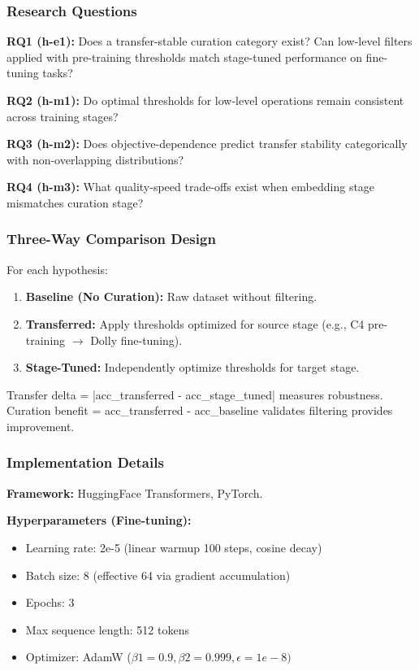 
\subsubsection{Research Questions}

\textbf{RQ1 (h-e1):} Does a transfer-stable curation category exist? Can low-level filters applied with pre-training thresholds match stage-tuned performance on fine-tuning tasks?

\textbf{RQ2 (h-m1):} Do optimal thresholds for low-level operations remain consistent across training stages?

\textbf{RQ3 (h-m2):} Does objective-dependence predict transfer stability categorically with non-overlapping distributions?

\textbf{RQ4 (h-m3):} What quality-speed trade-offs exist when embedding stage mismatches curation stage?

\subsubsection{Three-Way Comparison Design}

For each hypothesis:

\begin{enumerate}
\item \textbf{Baseline (No Curation):} Raw dataset without filtering.
\item \textbf{Transferred:} Apply thresholds optimized for source stage (e.g., C4 pre-training $\rightarrow$ Dolly fine-tuning).
\item \textbf{Stage-Tuned:} Independently optimize thresholds for target stage.
\end{enumerate}

Transfer delta = |acc\_transferred - acc\_stage\_tuned| measures robustness. Curation benefit = acc\_transferred - acc\_baseline validates filtering provides improvement.

\subsubsection{Implementation Details}

\textbf{Framework:} HuggingFace Transformers, PyTorch.

\textbf{Hyperparameters (Fine-tuning):}
\begin{itemize}
\item Learning rate: 2e-5 (linear warmup 100 steps, cosine decay)
\item Batch size: 8 (effective 64 via gradient accumulation)
\item Epochs: 3
\item Max sequence length: 512 tokens
\item Optimizer: AdamW ($\beta 1=0.9, \beta 2=0.999, \epsilon =1e-8)$
\end{itemize}

